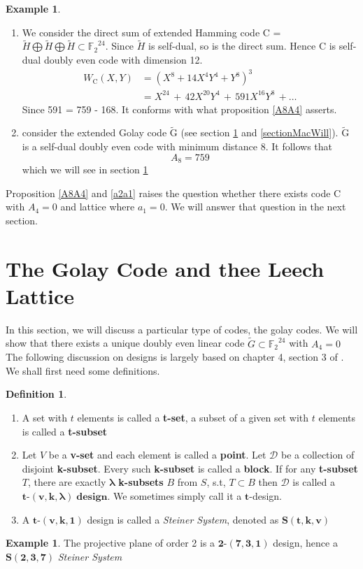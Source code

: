 \documentclass[12pt]{article}
\theoremstyle{definition}
\newtheorem{definition}[theorem]{Definition}
\newtheorem{example}[theorem]{Example}
\numberwithin{equation}{theorem}
\numberwithin{figure}{theorem}
\newcommand{\GExtend}{\ensuremath{\widetilde{G}}}
\newcommand{\Ftwo}{\ensuremath{\mathbb{F}_2}}
\newcommand{\tCompleteDesign}{\ensuremath{\bm{t\mbox{-}(v,k,\lambda)\; design}}}
\newcommand{\dDes}{\ensuremath{\mathcal{D}}}
\newcommand{\cCodes}{\ensuremath{\widetilde{\mathrm{G}}}}
\newcommand{\simpleCodes}{\ensuremath{\mathrm{C}}}
\newcommand{\weightEnumerator}[3]{\ensuremath{W_{#1}(#2,#3)}}
\begin{document}
\begin{example}\label{exampleA8A4}
\begin{enumerate}
	\item
We consider the direct sum of extended Hamming code {\simpleCodes} = $\widetilde{H} \bigoplus \widetilde{H} \bigoplus \widetilde{H} \subset \Ftwo^{24}$. Since $\widetilde{H}$ is self-dual, so is the direct sum. Hence {\simpleCodes} is self-dual doubly even code with dimension 12.\\
\begin{align*}
	\weightEnumerator{\simpleCodes}{X}{Y} &= (X^8 + 14X^4Y^4 + Y^8)^3 \\
	&= X^{24} \,+\, 42X^{20}Y^4 \,+\, 591X^{16}Y^8 \, + \ldots
\end{align*}
Since 591 = 759 - 168. It conforms with what proposition \ref{A8A4} asserts.
\item
consider the extended Golay code {\cCodes} (see section \ref{golaySection} and \ref{sectionMacWill}).  {\cCodes} is a self-dual doubly even code with minimum distance 8. It follows that
\[
	A_8 = 759
\]
which we will see in section \ref{golaySection}
\end{enumerate}
\end{example}
Proposition \ref{A8A4} and \ref{a2a1} raises the question whether there exists code $\simpleCodes$ with $A_4 = 0$ and lattice where $a_1 = 0$. We will answer that question in the next section.
\newpage
\section{The Golay Code and thee Leech Lattice}\label{golaySection}
In this section, we will discuss a particular type of codes, the golay codes. We will show that there exists a unique doubly even linear code  $\GExtend \subset \Ftwo^{24}$ with $A_4 = 0$ 
The following discussion on designs is largely based on chapter 4, section 3 of \cite{roman1992coding}.\\
We shall first need some definitions.
\begin{definition}\label{designDef} \hfill
	\begin{enumerate}
		\item A set with $t$ elements is called a \textbf{t-set}, a subset of a given set with $t$ elements is called a \textbf{t-subset}
		\item Let $V$ be a \textbf{v-set} and each element is called a \textbf{point}. Let {\dDes} be a collection of disjoint \textbf{k-subset}. Every such \textbf{k-subset} is called a \textbf{block}. If for any \textbf{t-subset} $T$, there are exactly $\mathbf{\lambda}$ \textbf{k-subsets} $B$ from $S$, s.t, $T \subset B$ then {\dDes} is called a \tCompleteDesign . We sometimes simply call it a $\bm{t}$-design.
		\item A $\bm{t\mbox{-}(v,k,1)}$ design is called a \emph{Steiner System}, denoted as $\bm{S(t,k,v)}$
	\end{enumerate}
\end{definition}
\begin{example}\label{projPlane}
		The projective plane of order 2 is a $\bm{2\mbox{-}(7,3,1)}$ design, hence a $\bm{S(2,3,7)}$ \emph{Steiner System}
\end{example}
\end{document}
